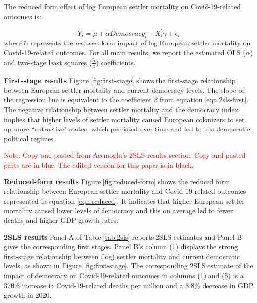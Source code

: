 
The reduced form effect of log European settler mortality on Covid-19-related outcomes is:

\begin{equation}
    \label{eqn:reduced}
    Y_i = \tilde{\mu} + \tilde{\alpha}Democracy_i + X^{'}_i\tilde{\gamma} + \tilde{\epsilon}_i
\end{equation}
where $\tilde{\alpha}$ represents the reduced form impact of log European settler mortality on Covid-19-related outcomes. For all main results, we report the estimated OLS ($\alpha$) and two-stage least squares ($\frac{\tilde{\alpha}}{\beta}$) coefficients. 


\noindent \textbf{First-stage results} Figure \ref{fig:first-stage} shows the first-stage relationship between European settler mortality and current democracy levels. The slope of the regression line is equivalent to the coefficient $\tilde{\beta}$ from equation \ref{eqn:2sls-first}. The negative relationship between settler mortality and the democracy index implies that higher levels of settler mortality caused European colonizers to set up more ``extractive" states, which persisted over time and led to less democratic political regimes. 

\textcolor{red}{Note: Copy and pasted from Acemoglu's 2SLS results section. Copy and pasted parts are in blue. The edited version for this paper is in black.}

\noindent \textbf{Reduced-form results} Figure \ref{fig:reduced-form} shows the reduced form relationship between European settler mortality and Covid-19-related outcomes represented in equation \ref{eqn:reduced}. It indicates that higher European settler mortality caused lower levels of democracy and this on average led to fewer deaths and higher GDP growth rates. 

\noindent \textbf{2SLS results} Panel A of Table \ref{tab:2sls} reports 2SLS estimates and Panel B gives the corresponding first stages. Panel B's column (1) displays the strong first-stage relationship between (log) settler mortality and current democratic levels, as shown in Figure \ref{fig:first-stage}. The corresponding 2SLS estimate of the impact of democracy on Covid-19-related outcomes in columns (1) and (5) is a 370.6 increase in Covid-19-related deaths per million and a 3.8\% decrease in GDP growth in 2020. 

